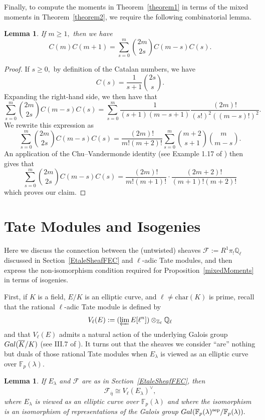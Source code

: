 \documentclass[12pt]{amsart}
\newtheorem{lemma}[theorem]{Lemma}
\theoremstyle{definition}
\theoremstyle{remark}
\numberwithin{equation}{section}
\def\Gal{{\rm Gal}}
\def\F{{\mathbb F}}
\def\Z{{\mathbb Z}}
\def\Q{{\mathbb Q}}
\def\Z{\mathbb{Z}}
\def\Q{\mathbb{Q}}
\def\F{\mathbb{F}}
\DeclareMathOperator{\sep}{sep}
\begin{document}
Finally, to compute the moments in Theorem~\ref{theorem1} in terms of the mixed moments in Theorem~\ref{theorem2}, we require the following combinatorial lemma.

\begin{lemma}\label{CombMom}
    If $m\geq 1,$ then we have
    $$
    C(m)C(m+1) = \sum_{s=0}^{m} \binom{2m}{2s} C(m-s)C(s).
    $$
\end{lemma}

\begin{proof}
If $s\geq 0,$ by definition of the Catalan numbers, we have
$$
C(s) = \frac{1}{s+1} \binom{2s}{s}.
$$
Expanding the right-hand side, we then have that
$$
\sum_{s=0}^{m} \binom{2m}{2s} C(m-s)C(s) = \sum_{s=0}^{m} \frac{1}{(s+1)(m-s+1)} \frac{(2m)!}{(s!)^{2}((m-s)!)^{2}}.
$$
We rewrite this expression as
$$
\sum_{s=0}^{m} \binom{2m}{2s} C(m-s)C(s) = \frac{(2m)!}{m!(m+2)!} \sum_{s=0}^{m} \binom{m+2}{s+1} \binom{m}{m-s}.
$$
An application of the Chu--Vandermonde identity (see Example 1.17 of \cite{EnumCombinatorics}) then gives that
$$
\sum_{s=0}^{m} \binom{2m}{2s} C(m-s)C(s) = \frac{(2m)!}{m!(m+1)!} \cdot \frac{(2m+2)!}{(m+1)!(m+2)!}
$$
which proves our claim.
\end{proof}


\section{Tate Modules and Isogenies}\label{Section6}

Here we discuss the connection between the (untwisted) sheaves $\mathcal{F}:=R^1\pi_!\Q_\ell$ discussed in Section~\ref{EtaleSheafFEC} and $\ell$-adic Tate modules, and then express the non-isomorphism condition required for Proposition~\ref{mixedMoments} in terms of isogenies.

First, if $K$ is a field, $E/K$ is an elliptic curve, and $\ell\neq\text{char}(K)$ is prime, recall that the rational $\ell$-adic Tate module is defined by
$$
V_\ell(E):=(\varprojlim E[\ell^n])\otimes_{\Z_\ell}\Q_\ell
$$
and that $V_\ell(E)$ admits a natural action of the underlying Galois group $\Gal(\overline{K}/K)$ (see III.7 of \cite{SilvermanAEC}).  It turns out that the sheaves we consider ``are'' nothing but duals of those rational Tate modules when $E_\lambda$ is viewed as an elliptic curve over $\F_p(\lambda).$

\begin{lemma}\label{TateSheaf}
    If $E_\lambda$ and $\mathcal{F}$ are as in Section~\ref{EtaleSheafFEC}, then
    $$
    \mathcal{F}_{\overline{\eta}}\cong V_\ell(E_\lambda)^\vee,
    $$
    where $E_\lambda$ is viewed as an elliptic curve over $\F_p(\lambda)$ and where the isomorphism is an isomorphism of representations of the Galois group $\Gal(\F_p(\lambda)^{\sep}/\F_p(\lambda)).$
\end{lemma}
\end{document}
